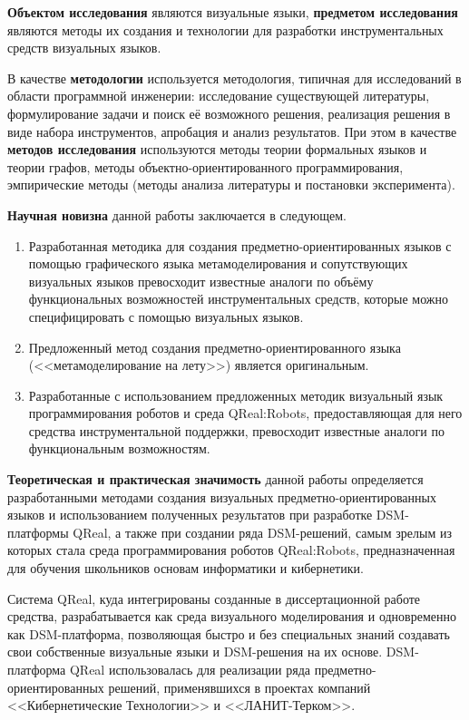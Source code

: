 \textbf{Объектом исследования} являются визуальные языки, \textbf{предметом исследования} 
являются методы их создания и технологии для разработки инструментальных средств визуальных языков.

В качестве \textbf{методологии} используется методология, типичная для исследований в 
области программной инженерии: исследование существующей литературы, формулирование задачи 
и поиск её возможного решения, реализация решения в виде набора инструментов, апробация 
и анализ результатов. При этом в качестве \textbf{методов исследования} используются 
методы теории формальных языков и теории графов, методы объектно-ориентированного программирования, 
эмпирические методы (методы анализа литературы и постановки эксперимента).

\textbf{Научная новизна} данной работы заключается в следующем.
\begin{enumerate}
	\item Разработанная методика для создания предметно-ориентированных языков с помощью 
		графического языка метамоделирования и сопутствующих визуальных языков превосходит 
		известные аналоги по объёму функциональных возможностей инструментальных средств, 
		которые можно специфицировать с помощью визуальных языков.
	\item Предложенный метод создания предметно-ориентированного языка (<<метамоделирование на лету>>)
	является оригинальным. 
	\item Разработанные с использованием предложенных методик визуальный язык программирования роботов 
		и среда QReal:Robots, предоставляющая для него средства инструментальной поддержки, 
		превосходит известные аналоги по функциональным возможностям.
\end{enumerate}

\textbf{Теоретическая и практическая значимость} данной работы определяется разработанными 
методами создания визуальных предметно-ориентированных языков и использованием полученных 
результатов при разработке DSM-платформы QReal, а также при создании ряда DSM-решений, 
самым зрелым из которых стала среда программирования роботов QReal:Robots, 
предназначенная для обучения школьников основам информатики и кибернетики.

Система QReal, куда интегрированы созданные в диссертационной работе средства, разрабатывается 
как среда визуального моделирования и одновременно как DSM-платформа, 
позволяющая быстро и без специальных знаний создавать свои собственные 
визуальные языки и DSM-решения на их основе. DSM-платформа QReal использовалась
для реализации ряда предметно-ориентированных решений, применявшихся в 
проектах компаний <<Кибернетические Технологии>> и <<ЛАНИТ-Терком>>.

